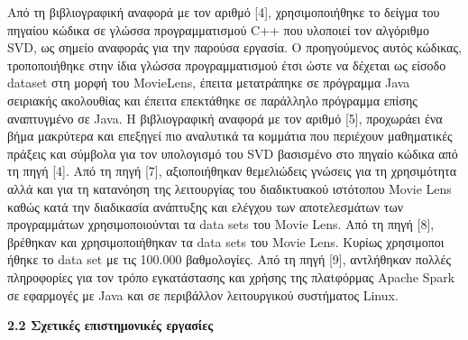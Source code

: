 \documentclass{report}
\begin{document}
Από τη βιβλιογραφική αναφορά με τον αριθμό [4], χρησιμοποιήθηκε το δείγμα του πηγαίου κώδικα σε
γλώσσα προγραμματισμού \textlatin{C++} που υλοποιεί τον αλγόριθμο \textlatin{SVD}, ως σημείο αναφοράς για την παρούσα
εργασία. Ο προηγούμενος αυτός κώδικας, τροποποιήθηκε στην ίδια γλώσσα προγραμματισμού έτσι ώστε
να δέχεται ως είσοδο \textlatin{dataset} στη μορφή του \textlatin{MovieLens}, έπειτα μετατράπηκε σε πρόγραμμα \textlatin{Java} σειριακής
ακολουθίας και έπειτα επεκτάθηκε σε παράλληλο πρόγραμμα επίσης αναπτυγμένο σε \textlatin{Java}.
Η βιβλιογραφική αναφορά με τον αριθμό [5], προχωράει ένα βήμα μακρύτερα και επεξηγεί πιο αναλυτικά
τα κομμάτια που περιέχουν μαθηματικές πράξεις και σύμβολα για τον υπολογισμό του \textlatin{SVD} βασισμένο στο
πηγαίο κώδικα από τη πηγή [4].
Από τη πηγή [7], αξιοποιήθηκαν θεμελιώδεις γνώσεις για τη χρησιμότητα αλλά και για τη κατανόηση
της λειτουργίας του διαδικτυακού ιστότοπου \textlatin{Movie Lens} καθώς κατά την διαδικασία ανάπτυξης και ελέγχου
των αποτελεσμάτων των προγραμμάτων χρησιμοποιούνται τα \textlatin{data sets} του \textlatin{Movie Lens}.
Από τη πηγή [8], βρέθηκαν και χρησιμοποιήθηκαν τα \textlatin{data sets} του \textlatin{Movie Lens}. Κυρίως χρησιμοποι
ήθηκε το \textlatin{data set} με τις 100.000 βαθμολογίες.
Από τη πηγή [9], αντλήθηκαν πολλές πληροφορίες για τον τρόπο εγκατάστασης και χρήσης της πλαtφόρμας \textlatin{Apache Spark} σε εφαρμογές με \textlatin{Java} και σε περιβάλλον λειτουργικού συστήματος \textlatin{Linux}.


\vspace{5mm}

\textbf{\large{2.2  Σχετικές επιστημονικές εργασίες }}

\vspace{2mm}
\end{document}
